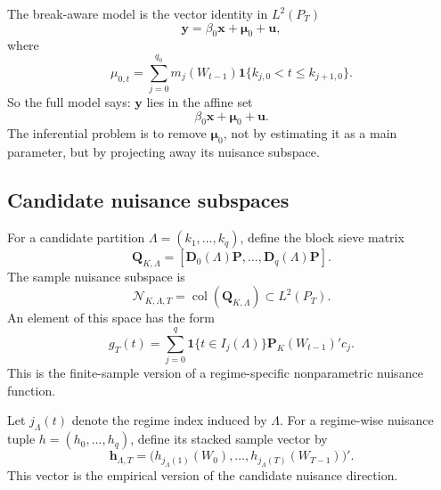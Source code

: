 \documentclass[12pt]{article}
\numberwithin{equation}{section}
\theoremstyle{definition}
\newcommand{\ind}{\mathbf 1}
\newcommand{\N}{\mathcal N}
\newcommand{\LtwoT}{L^2(P_T)}
\begin{document}
The break-aware model is the vector identity in \(\LtwoT\)
\begin{equation}
    \bm y=\beta_0\bm x+\bm\mu_0+\bm u,
    \label{eq:l2pt-model}
\end{equation}
where
\[
    \mu_{0,t}=\sum_{j=0}^{q_0}m_j(W_{t-1})\ind\{k_{j,0}<t\le k_{j+1,0}\}.
\]
So the full model says: \(\bm y\) lies in the affine set
\[
    \beta_0\bm x+\bm\mu_0+\bm u.
\]
The inferential problem is to remove \(\bm\mu_0\), not by estimating it as a
main parameter, but by projecting away its nuisance subspace.

\subsection{Candidate nuisance subspaces}

For a candidate partition \(\Lambda=(k_1,\ldots,k_q)\), define the block sieve
matrix
\[
    \bm Q_{K,\Lambda}
    =[
      \bm D_0(\Lambda)\bm P,
      \ldots,
      \bm D_q(\Lambda)\bm P
    ].
\]
The sample nuisance subspace is
\begin{equation}
    \N_{K,\Lambda,T}
    =\operatorname{col}(\bm Q_{K,\Lambda})\subset\LtwoT.
    \label{eq:sample-nuisance-space}
\end{equation}
An element of this space has the form
\[
    g_T(t)=\sum_{j=0}^q\ind\{t\in I_j(\Lambda)\}\bm P_K(W_{t-1})'c_j.
\]
This is the finite-sample version of a regime-specific nonparametric nuisance
function.

Let \(j_\Lambda(t)\) denote the regime index induced by \(\Lambda\). For a
regime-wise nuisance tuple \(h=(h_0,\ldots,h_q)\), define its stacked sample
vector by
\[
    \bm h_{\Lambda,T}
    =\big(h_{j_\Lambda(1)}(W_0),\ldots,
          h_{j_\Lambda(T)}(W_{T-1})\big)'.
\]
This vector is the empirical version of the candidate nuisance direction.
\end{document}
